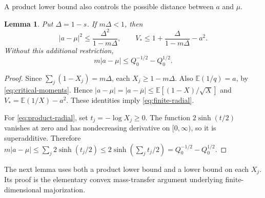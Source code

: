 \documentclass[11pt,reqno]{amsart}
\newtheorem{lem}[thm]{Lemma}
\theoremstyle{definition}
\theoremstyle{remark}
\numberwithin{equation}{section}
\newcommand{\E}{\mathbb E}
\begin{document}
A product lower bound also controls the possible distance between $a$ and $\mu$.

\begin{lem}\label{lem:radial-bounds}
Put $\Delta=1-s$. If $m\Delta<1$, then
\begin{equation}\label{eq:finite-radial}
 |a-\mu|^2\le\frac{\Delta^2}{1-m\Delta},\qquad
 V_*\le1+\frac{\Delta}{1-m\Delta}-a^2.
\end{equation}
Without this additional restriction,
\begin{equation}\label{eq:product-radial}
 m|a-\mu|\le Q_0^{-1/2}-Q_0^{1/2}.
\end{equation}
\end{lem}
\begin{proof}
Since $\sum_j(1-X_j)=m\Delta$, each $X_j\ge1-m\Delta$. Also $\E(1/q)=a$, by \eqref{eq:critical-moments}. Hence
$|a-\mu|=|a-\overline\mu|\le\E[(1-X)/\sqrt X]$ and
$V_*=\E(1/X)-a^2$.
These identities imply \eqref{eq:finite-radial}.

For \eqref{eq:product-radial}, set $t_j=-\log X_j\ge0$. The function $2\sinh(t/2)$ vanishes at zero and has nondecreasing derivative on $[0,\infty)$, so it is superadditive. Therefore
$m|a-\mu|\le\sum_j2\sinh(t_j/2)\le2\sinh(\sum_jt_j/2)=Q_0^{-1/2}-Q_0^{1/2}$.
\end{proof}

The next lemma uses both a product lower bound and a lower bound on each $X_j$. Its proof is the elementary convex mass-transfer argument underlying finite-dimensional majorization.
\end{document}

